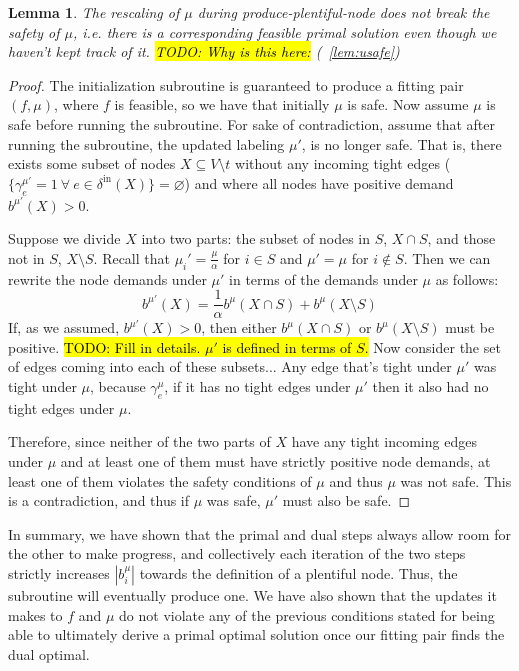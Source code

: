 \documentclass[11pt]{article}
\newtheorem{lemma}[theorem]{Lemma}
\theoremstyle{definition}
\theoremstyle{definition}
\theoremstyle{definition}
\newcommand{\biu}{b_{i}^{\mu}}
\newcommand{\geu}{\gamma_e^{\mu}}
\newcommand{\vnott}{V \setminus t}
\newcommand{\din}{\delta^{\text{in}}}
\newcommand{\fp}{(f,\mu)}
\renewcommand{\todo}[1]{\hl{TODO: #1}}
\begin{document}
    \begin{lemma}
        The rescaling of $\mu$ during produce-plentiful-node does not break 
        the safety of $\mu$, i.e. there is a corresponding feasible primal
        solution even though we haven't kept track of it.
        \todo{Why is this here:} (~\ref{lem:usafe})
    \end{lemma}
    \begin{proof}
    The initialization subroutine is guaranteed to produce a fitting pair $\fp$,
    where $f$ is feasible, so we have that initially $\mu$ is safe. Now assume $\mu$
    is safe before running the subroutine. For sake of contradiction, assume that
    after running the subroutine, the updated labeling $\mu'$,
    is no longer safe. That is, there exists some subset of nodes $X \subseteq \vnott$  
    without any incoming tight edges ($\{\gamma_e^{\mu'} = 1\ \forall\ e \in \din(X)\} = \varnothing$)
    and where all nodes have positive demand $b^{\mu'}(X) > 0$.

    Suppose we divide $X$ into two parts: the subset of nodes in $S$, $X \cap S$, and those
    not in $S$, $X \setminus S$. Recall that $\mu_i' = \frac{\mu}{\alpha}$ for $i\in S$
    and $\mu' = \mu$ for $i \notin S$. Then we can rewrite the node demands under $\mu'$
    in terms of the demands under $\mu$ as follows:
    $$b^{\mu'}(X) = \frac{1}{\alpha}b^{\mu}(X \cap S) + b^{\mu}(X \setminus S)$$
    If, as we assumed, $b^{\mu'}(X) > 0$, then either $b^{\mu}(X \cap S)$ or 
    $b^{\mu}(X \setminus S)$ must be positive.
    \todo{Fill in details. $\mu'$ is defined in terms of $S$.}
    Now consider the set of edges coming into each of these subsets...
    Any edge that's tight under $\mu'$ was tight under $\mu$, because $\geu$, if
    it has no tight edges under $\mu'$ then it also had no tight edges under
    $\mu$.

    Therefore, since neither of the two parts of $X$
    have any tight incoming edges under $\mu$ and at least one of them
    must have strictly positive node demands, at least one of them
    violates the safety conditions of $\mu$ and thus $\mu$ was not safe.
    This is a contradiction, and thus if $\mu$ was safe, $\mu'$ must also be safe.

    \end{proof}

    In summary, we have shown that the primal and dual steps always allow room for the other to make progress, and collectively each iteration of the two steps strictly increases $|\biu|$ towards
    the definition of a plentiful node. Thus, the subroutine will eventually produce one. We have also shown that the updates it makes to $f$ and $\mu$ do not violate any of the previous conditions stated for being able to ultimately derive a primal optimal solution once our fitting pair finds the dual optimal. 
\end{document}
